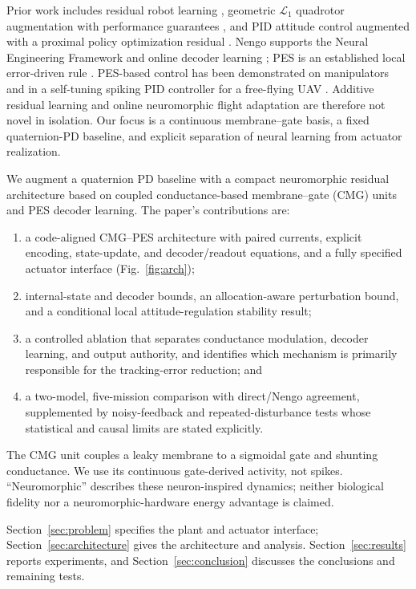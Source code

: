 \documentclass[letterpaper, 10 pt, conference]{ieeeconf}
\begin{document}
Prior work includes residual robot learning \cite{johannink2019}, geometric $\mathcal L_1$ quadrotor augmentation with performance guarantees \cite{wu2025l1quad}, and PID attitude control augmented with a proximal policy optimization residual \cite{li2027hpappo}. Nengo supports the Neural Engineering Framework and online decoder learning \cite{bekolay2014nengo}; PES is an established local error-driven rule \cite{voelker2015pes}. PES-based control has been demonstrated on manipulators \cite{dewolf2016arm,dewolf2020nengo} and in a self-tuning spiking PID controller for a free-flying UAV \cite{olivares2026selftuning}. Additive residual learning and online neuromorphic flight adaptation are therefore not novel in isolation. Our focus is a continuous membrane--gate basis, a fixed quaternion-PD baseline, and explicit separation of neural learning from actuator realization.

We augment a quaternion PD baseline with a compact neuromorphic residual architecture based on coupled conductance-based membrane--gate (CMG) units and PES decoder learning. The paper's contributions are:
\begin{enumerate}
    \item a code-aligned CMG--PES architecture with paired currents, explicit encoding, state-update, and decoder/readout equations, and a fully specified actuator interface (Fig.~\ref{fig:arch});
    \item internal-state and decoder bounds, an allocation-aware perturbation bound, and a conditional local attitude-regulation stability result;
    \item a controlled ablation that separates conductance modulation, decoder learning, and output authority, and identifies which mechanism is primarily responsible for the tracking-error reduction; and
    \item a two-model, five-mission comparison with direct/Nengo agreement, supplemented by noisy-feedback and repeated-disturbance tests whose statistical and causal limits are stated explicitly.
\end{enumerate}

The CMG unit couples a leaky membrane to a sigmoidal gate and shunting conductance. We use its continuous gate-derived activity, not spikes. ``Neuromorphic'' describes these neuron-inspired dynamics; neither biological fidelity nor a neuromorphic-hardware energy advantage is claimed.

Section~\ref{sec:problem} specifies the plant and actuator interface; Section~\ref{sec:architecture} gives the architecture and analysis. Section~\ref{sec:results} reports experiments, and Section~\ref{sec:conclusion} discusses the conclusions and remaining tests.
\end{document}
